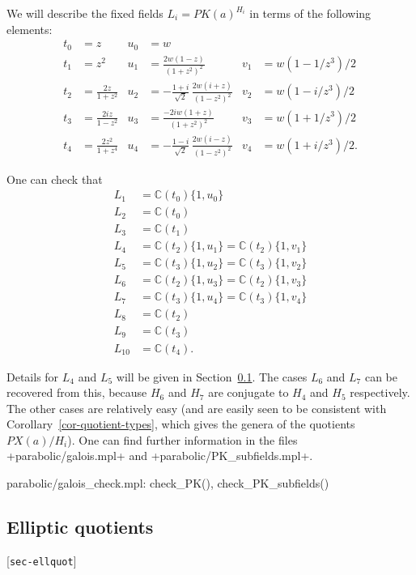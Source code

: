 \documentclass[reqno]{amsart}
\newcommand{\lbl}[1]{\label{#1}\textup{[\texttt{#1}]}\par}
\newcommand{\lbl}{\label}
\newcommand{\C}         {{\mathbb{C}}}
\newcommand{\rt}        {\sqrt{2}}
\renewcommand{\:}{\colon}
\theoremstyle{definition}
\begin{document}
We will describe the fixed fields $L_i=PK(a)^{H_i}$ in terms of the
following elements:
\begin{align*}
 t_0 &= z   & u_0 &= w \\
 t_1 &= z^2 &
 u_1 &= \frac{2w(1-z)}{(1+z^2)^2} &
 v_1 &= w(1-1/z^3)/2 \\
 t_2 &= \frac{2z}{1+z^2} & 
 u_2 &= -\frac{1+i}{\rt}\,\frac{2w(i+z)}{(1-z^2)^2} &
 v_2 &= w(1-i/z^3)/2 \\
 t_3 &= \frac{2iz}{1-z^2} & 
 u_3 &= \frac{-2iw(1+z)}{(1+z^2)^2} &
 v_3 &= w(1+1/z^3)/2 \\
 t_4 &= \frac{2z^2}{1+z^4} & 
 u_4 &= -\frac{1-i}{\rt}\,\frac{2w(i-z)}{(1-z^2)^2} &
 v_4 &= w(1+i/z^3)/2.
\end{align*}

One can check that 
\begin{align*}
 L_1    &= \C(t_0)\{1,u_0\} \\
 L_2    &= \C(t_0) \\
 L_3    &= \C(t_1) \\
 L_4    &= \C(t_2)\{1,u_1\} = \C(t_2)\{1,v_1\} \\
 L_5    &= \C(t_3)\{1,u_2\} = \C(t_3)\{1,v_2\} \\
 L_6    &= \C(t_2)\{1,u_3\} = \C(t_2)\{1,v_3\} \\
 L_7    &= \C(t_3)\{1,u_4\} = \C(t_3)\{1,v_4\} \\
 L_8    &= \C(t_2) \\
 L_9    &= \C(t_3) \\
 L_{10} &= \C(t_4).
\end{align*}

Details for $L_4$ and $L_5$ will be given in
Section~\ref{sec-ellquot}.  The cases $L_6$ and $L_7$ can be recovered
from this, because $H_6$ and $H_7$ are conjugate to $H_4$ and $H_5$
respectively.  The other cases are relatively easy (and are easily
seen to be consistent with Corollary~\ref{cor-quotient-types}, which
gives the genera of the quotients $PX(a)/H_i$).  One can find further
information in the files \fname+parabolic/galois.mpl+ and
\fname+parabolic/PK_subfields.mpl+.  
\begin{checks}
 parabolic/galois_check.mpl: check_PK(), check_PK_subfields()
\end{checks}

\subsection{Elliptic quotients}
\lbl{sec-ellquot}
\end{document}
